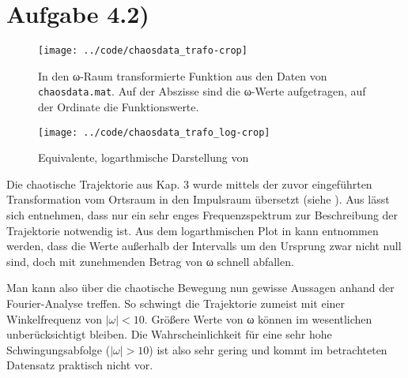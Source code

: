 \section*{Aufgabe 4.2)}



\begin{figure}[htb]
\centering
  \texttt{[image: ../code/chaosdata\_trafo-crop]}
  \caption{In den ω-Raum transformierte Funktion aus den Daten von \texttt{chaosdata.mat}. Auf der Abszisse sind
  die ω-Werte aufgetragen, auf der Ordinate die Funktionswerte.}
  \label{fig:chaos}
\end{figure}

\begin{figure}[htb]
\centering
  \texttt{[image: ../code/chaosdata\_trafo\_log-crop]}
  \caption{Equivalente, logarthmische Darstellung von }
  \label{fig:chaoslog}
\end{figure}

Die chaotische Trajektorie aus Kap. 3 wurde mittels der zuvor eingeführten
Transformation vom Ortsraum in den Impulsraum übersetzt (siehe ). Aus  lässt
sich entnehmen, dass nur ein sehr enges Frequenzspektrum zur Beschreibung der
Trajektorie notwendig ist. Aus dem logarthmischen Plot in  kann
entnommen werden, dass die Werte außerhalb der Intervalls um den Ursprung zwar nicht
null sind, doch mit zunehmenden Betrag von ω schnell abfallen.

Man kann also über die chaotische Bewegung nun gewisse Aussagen anhand der
Fourier-Analyse treffen. So schwingt die Trajektorie zumeist mit einer
Winkelfrequenz von $|ω| < 10$. Größere Werte von ω können im wesentlichen
unberücksichtigt bleiben. Die Wahrscheinlichkeit für eine sehr hohe Schwingungsabfolge
($|ω| > 10$) ist also sehr gering und kommt im betrachteten Datensatz
praktisch nicht vor.